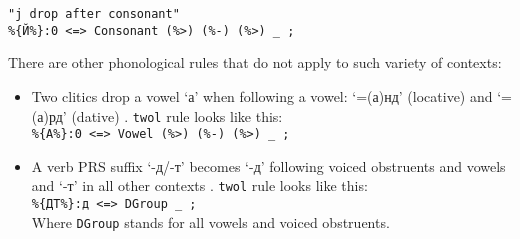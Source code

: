\begin{code_frame}[float]
    \begin{footnotesize}
    \begin{verbatim}
"j drop after consonant"
%{Й%}:0 <=> Consonant (%>) (%-) (%>) _ ;
    \end{verbatim}
    \end{footnotesize}
    \tcblower
    \label{code:5_2}
\end{code_frame}

There are other phonological rules that do not apply to such variety of contexts:
\begin{itemize}
    \item Two clitics drop a vowel `а' when following a vowel: `=(а)нд' (locative) and `=(а)рд' (dative) . \texttt{twol} rule looks like this:\\
    \texttt{\%\{А\%\}:0 <=> Vowel (\%>) (\%-) (\%>) \_ ;}
    \item A verb PRS suffix `-д/-т' becomes `-д' following voiced obstruents and vowels and `-т' in all other contexts \parencite[262]{parker_shughni_2023}. \texttt{twol} rule looks like this:\\
    \texttt{\%\{ДТ\%\}:д <=> DGroup \_ ;}\\
    Where \texttt{DGroup} stands for all vowels and voiced obstruents.
\end{itemize}

